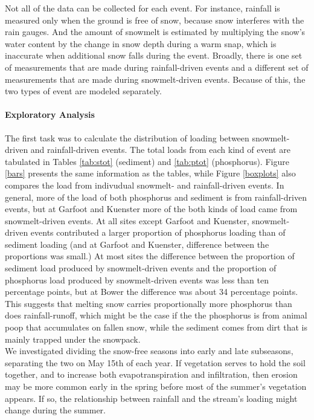\documentclass[10pt]{article}
\begin{document}
Not all of the data can be collected for each event. For instance, rainfall is measured only when the ground is free of snow, because snow interferes with the rain gauges. And the amount of snowmelt is estimated by multiplying the snow's water content by the change in snow depth during a warm snap, which is inaccurate when additional snow falls during the event. Broadly, there is one set of measurements that are made during rainfall-driven events and a different set of measurements that are made during snowmelt-driven events. Because of this, the two types of event are modeled separately.\\

\paragraph{Exploratory Analysis}
The first task was to calculate the distribution of loading between snowmelt-driven and rainfall-driven events. The total loads from each kind of event are tabulated in Tables \ref{tab:stot} (sediment) and \ref{tab:ptot} (phosphorus). Figure \ref{bars} presents the same information as the tables, while Figure \ref{boxplots} also compares the load from indivudual snowmelt- and rainfall-driven events. In general, more of the load of both phosphorus and sediment is from rainfall-driven events, but at Garfoot and Kuenster more of the both kinds of load came from snowmelt-driven events. At all sites except Garfoot and Kuenster, snowmelt-driven events contributed a larger proportion of phosphorus loading than of sediment loading (and at Garfoot and Kuenster, difference between the proportions was small.) At most sites the difference between the proportion of sediment load produced by snowmelt-driven events and the proportion of phosphorus load produced by snowmelt-driven events was less than ten percentage points, but at Bower the difference was about 34 percentage points. This suggests that melting snow carries proportionally more phosphorus than does rainfall-runoff, which might be the case if the the phosphorus is from animal poop that accumulates on fallen snow, while the sediment comes from dirt that is mainly trapped under the snowpack.\\

We investigated dividing the snow-free seasons into early and late subseasons, separating the two on May 15th of each year. If vegetation serves to hold the soil together, and to increase both evapotranspiration and infiltration, then erosion may be more common early in the spring before most of the summer's vegetation appears. If so, the relationship between rainfall and the stream's loading might change during the summer.\\
\end{document}
